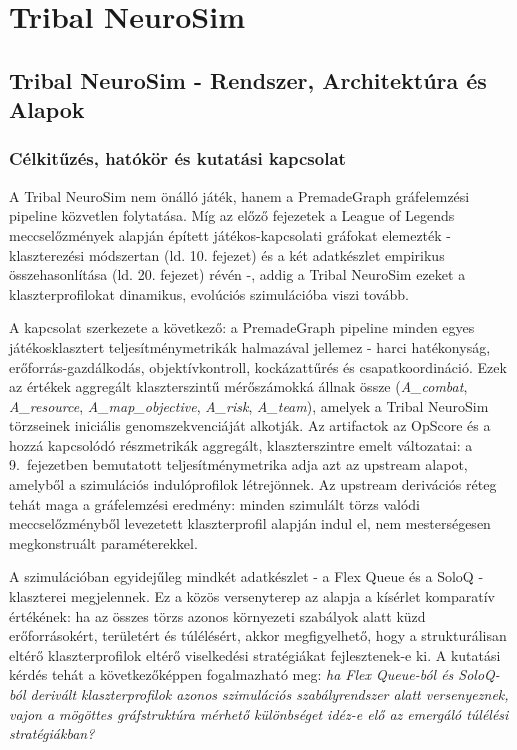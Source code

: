 ﻿\documentclass[a4paper,12pt]{report}
\begin{document}
\part{Tribal NeuroSim}

\chapter{Tribal NeuroSim - Rendszer, Architektúra és Alapok}

\section{Célkitűzés, hatókör és kutatási kapcsolat}
\label{sec:neurosim-24-scope}

A Tribal NeuroSim nem önálló játék, hanem a PremadeGraph gráfelemzési pipeline közvetlen folytatása.
Míg az előző fejezetek a League of Legends meccselőzmények alapján épített játékos-kapcsolati gráfokat elemezték -
klaszterezési módszertan (ld. 10. fejezet) és a két adatkészlet empirikus összehasonlítása (ld. 20. fejezet) révén -,
addig a Tribal NeuroSim ezeket a klaszterprofilokat dinamikus, evolúciós szimulációba viszi tovább.

A kapcsolat szerkezete a következő: a PremadeGraph pipeline minden egyes játékosklasztert
teljesítménymetrikák halmazával jellemez - harci hatékonyság, erőforrás-gazdálkodás, objektívkontroll,
kockázattűrés és csapatkoordináció. Ezek az értékek aggregált klaszterszintű mérőszámokká állnak össze
(\textit{A\_combat}, \textit{A\_resource}, \textit{A\_map\_objective}, \textit{A\_risk}, \textit{A\_team}),
amelyek a Tribal NeuroSim törzseinek iniciális genomszekvenciáját alkotják. Az artifactok
az OpScore és a hozzá kapcsolódó részmetrikák aggregált, klaszterszintre emelt változatai:
a 9.~fejezetben bemutatott teljesítménymetrika adja azt az upstream alapot, amelyből a
szimulációs indulóprofilok létrejönnek.
Az upstream derivációs réteg tehát maga a gráfelemzési eredmény: minden szimulált törzs valódi
meccselőzményből levezetett klaszterprofil alapján indul el, nem mesterségesen megkonstruált paraméterekkel.

A szimulációban egyidejűleg mindkét adatkészlet - a Flex Queue és a SoloQ - klaszterei megjelennek.
Ez a közös versenyterep az alapja a kísérlet komparatív értékének: ha az összes törzs azonos
környezeti szabályok alatt küzd erőforrásokért, területért és túlélésért, akkor megfigyelhető,
hogy a strukturálisan eltérő klaszterprofilok eltérő viselkedési stratégiákat fejlesztenek-e ki.
A kutatási kérdés tehát a következőképpen fogalmazható meg:
\textit{ha Flex Queue-ból és SoloQ-ból derivált klaszterprofilok azonos szimulációs szabályrendszer
alatt versenyeznek, vajon a mögöttes gráfstruktúra mérhető különbséget idéz-e elő az emergáló
túlélési stratégiákban?}
\end{document}
